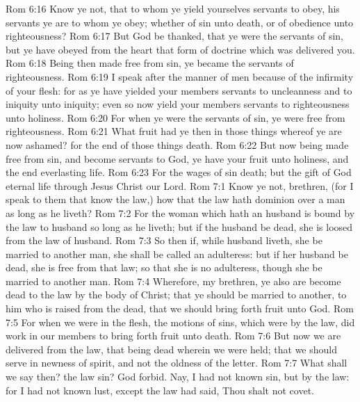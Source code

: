 \vs Rom 6:16 Know ye not, that to whom ye yield yourselves servants to obey, his servants ye are to whom ye obey; whether of sin unto death, or of obedience unto righteousness?
\vs Rom 6:17 But God be thanked, that ye were the servants of sin, but ye have obeyed from the heart that form of doctrine which was delivered you.
\vs Rom 6:18 Being then made free from sin, ye became the servants of righteousness.
\vs Rom 6:19 I speak after the manner of men because of the infirmity of your flesh: for as ye have yielded your members servants to uncleanness and to iniquity unto iniquity; even so now yield your members servants to righteousness unto holiness.
\vs Rom 6:20 For when ye were the servants of sin, ye were free from righteousness.
\vs Rom 6:21 What fruit had ye then in those things whereof ye are now ashamed? for the end of those things  death.
\vs Rom 6:22 But now being made free from sin, and become servants to God, ye have your fruit unto holiness, and the end everlasting life.
\vs Rom 6:23 For the wages of sin  death; but the gift of God  eternal life through Jesus Christ our Lord.
\vs Rom 7:1 Know ye not, brethren, (for I speak to them that know the law,) how that the law hath dominion over a man as long as he liveth?
\vs Rom 7:2 For the woman which hath an husband is bound by the law to  husband so long as he liveth; but if the husband be dead, she is loosed from the law of  husband.
\vs Rom 7:3 So then if, while  husband liveth, she be married to another man, she shall be called an adulteress: but if her husband be dead, she is free from that law; so that she is no adulteress, though she be married to another man.
\vs Rom 7:4 Wherefore, my brethren, ye also are become dead to the law by the body of Christ; that ye should be married to another,  to him who is raised from the dead, that we should bring forth fruit unto God.
\vs Rom 7:5 For when we were in the flesh, the motions of sins, which were by the law, did work in our members to bring forth fruit unto death.
\vs Rom 7:6 But now we are delivered from the law, that being dead wherein we were held; that we should serve in newness of spirit, and not  the oldness of the letter.
\vs Rom 7:7 What shall we say then?  the law sin? God forbid. Nay, I had not known sin, but by the law: for I had not known lust, except the law had said, Thou shalt not covet.
